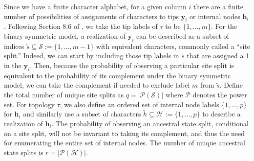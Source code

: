 \documentclass[a4paper]{article}
\newcommand{\alignmentColumn}{\mathbf{y}}
\newcommand{\siteSplit}{\tilde{s}}
\newcommand{\siteSplitSet}{\mathcal{S}}
\newcommand{\ancestralStateColumn}{\mathbf{h}}
\newcommand{\ancestralSplit}{\tilde{h}}
\newcommand{\ancestralSplitSet}{\mathcal{H}}
\newcommand{\nSiteRows}{m}
\newcommand{\nAncestralStateRows}{p}
\newcommand{\nSiteSplits}{q}
\newcommand{\nAncestralSplits}{r}
\begin{document}
Since we have a finite character alphabet, for a given column $i$ there are a finite number of possibilities of assignments of characters to tips $\alignmentColumn_i$ or internal nodes $\ancestralStateColumn_i$.
Following Section 8.6 of \cite{Semple2003-em}, we take the tip labels of $\tau$ to be $\{1,\ldots,\nSiteRows\}$.
For the binary symmetric model, a realization of $\alignmentColumn_i$ can be described as a subset of indices $\siteSplit\subseteq\siteSplitSet:=\{1,\ldots,\nSiteRows-1\}$ with equivalent characters, commonly called a ``site split.''
Indeed, we can start by including those tip labels in $\siteSplit$ that are assigned a 1 in the $\alignmentColumn_i$.
Then, because the probability of observing a particular site split is equivalent to the probability of its complement under the binary symmetric model, we can take the complement if needed to exclude label $\nSiteRows$ from $\siteSplit$.
Define the total number of unique site splits as $\nSiteSplits=|\mathcal{P}(\siteSplitSet)|$ where $\mathcal{P}$ denotes the power set.
For topology $\tau$, we also define an ordered set of internal node labels $\{1,\ldots,\nAncestralStateRows\}$ for $\ancestralStateColumn_i$ and similarly use a subset of characters $\ancestralSplit\subseteq\ancestralSplitSet:=\{1,\ldots,\nAncestralStateRows\}$ to describe a realization of $\ancestralStateColumn_i$.
The probability of observing an ancestral state split, conditional on a site split, will not be invariant to taking its complement, and thus the need for enumerating the entire set of internal nodes.
The number of unique ancestral state splits is $\nAncestralSplits=|\mathcal{P}(\ancestralSplitSet)|$.
\end{document}
